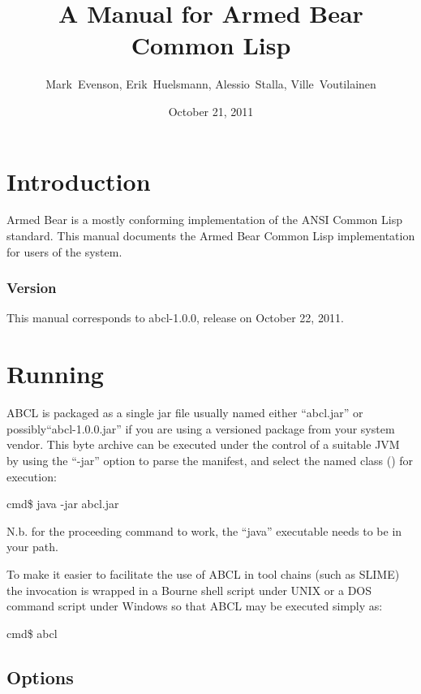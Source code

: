 \documentclass[10pt]{book}
\begin{document}
\title{A Manual for Armed Bear Common Lisp}
\date{October 21, 2011}
\author{Mark~Evenson, Erik~Huelsmann, Alessio~Stalla, Ville~Voutilainen}

\maketitle

\chapter{Introduction}

Armed Bear is a mostly conforming implementation of the ANSI Common
Lisp standard.  This manual documents the Armed Bear Common Lisp
implementation for users of the system.

\subsection{Version}
This manual corresponds to abcl-1.0.0, release on October 22, 2011.

\chapter{Running}

\textsc{ABCL} is packaged as a single jar file usually named either
``abcl.jar'' or possibly``abcl-1.0.0.jar'' if you are using a
versioned package from your system vendor.  This byte archive can be
executed under the control of a suitable JVM by using the ``-jar''
option to parse the manifest, and select the named class
() for execution:

\begin{listing-shell}
  cmd\$ java -jar abcl.jar
\end{listing-shell}

N.b. for the proceeding command to work, the ``java'' executable needs
to be in your path.

To make it easier to facilitate the use of ABCL in tool chains (such as
SLIME) the invocation is wrapped in a Bourne shell script under UNIX
or a DOS command script under Windows so that ABCL may be executed
simply as:

\begin{listing-shell}
  cmd\$ abcl
\end{listing-shell}

\section{Options}
\end{document}
